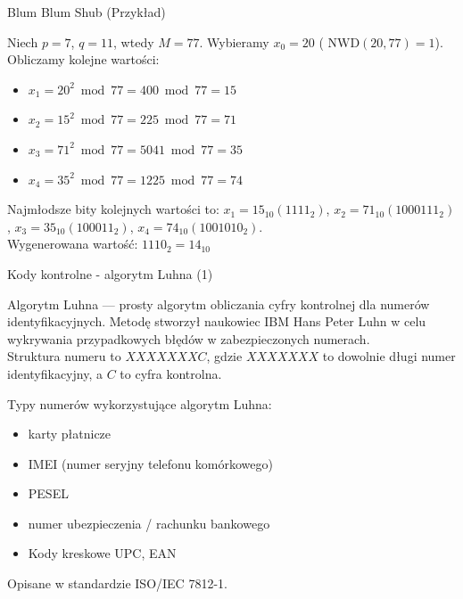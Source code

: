 \documentclass[polish,envcountsect,10pt]{beamer}
\begin{document}
\begin{frame}{Blum Blum Shub (Przykład)}
    \begin{example}
        Niech $p = 7$, $q = 11$, wtedy $M = 77$. Wybieramy $x_0 = 20$ ( $\text{NWD}(20, 77) = 1$).
        Obliczamy kolejne wartości:
        \begin{itemize}
            \item $x_1 = 20^2 \bmod{77} = 400 \bmod{77} = 15$
            \item $x_2 = 15^2 \bmod{77} = 225 \bmod{77} = 71$
            \item $x_3 = 71^2 \bmod{77} = 5041 \bmod{77} = 35$
            \item $x_4 = 35^2 \bmod{77} = 1225 \bmod{77} = 74$
        \end{itemize}
        Najmłodsze bity kolejnych wartości to: $x_1 = 15_{10} (1111_2)$, $x_2 = 71_{10} (1000111_2)$, $x_3 = 35_{10} (100011_2)$, $x_4 = 74_{10} (1001010_2)$.
        \\
        Wygenerowana wartość: $1110_2 = 14_{10}$
    \end{example}
\end{frame}
%


\begin{frame}{Kody kontrolne - algorytm Luhna (1)}
    \begin{definition}
        Algorytm Luhna — prosty algorytm obliczania cyfry kontrolnej dla numerów identyfikacyjnych. Metodę stworzył naukowiec IBM Hans Peter Luhn w celu wykrywania przypadkowych błędów w zabezpieczonych numerach. \\
        Struktura numeru to $XXXXXXXC$, gdzie $XXXXXXX$ to dowolnie długi numer identyfikacyjny, a $C$ to cyfra kontrolna.
    \end{definition}

    Typy numerów wykorzystujące algorytm Luhna:
    \begin{itemize}
        \item karty płatnicze
        \item IMEI (numer seryjny telefonu komórkowego)
        \item PESEL
        \item numer ubezpieczenia / rachunku bankowego
        \item Kody kreskowe UPC, EAN
    \end{itemize}
    
    Opisane w standardzie ISO/IEC 7812-1.

\end{frame}
%
\end{document}
